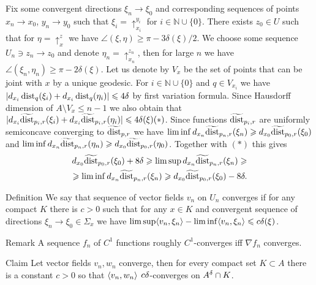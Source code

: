 \documentclass[a4paper,10pt]{article}
\begin{document}
Fix some convergent directions $\xi_n\to\xi_0$ and
corresponding sequences of points
$x_n\to x_0$, $y_n\to y_0$
such that  $\xi_i=\uparrow_{x_i}^{y_i}$ for $i\in\mathbb N\cup\{0\}$.
There exists $z_0 \in U$ such that for $\eta=\uparrow_x^z$ 
we have
$\angle(\xi,\eta)\ge \pi-3\delta(\xi)/2$.
We choose some sequence 
$U_n\ni z_n\to z_0$
and denote
$\eta_n=\uparrow_{x_n}^{z_n}$,
then for large $n$ we have $\angle(\xi_n,\eta_n)\ge \pi-2\delta(\xi)$.
Let us denote by $V_x$ be the set of points that can be joint with $x$
by a unique geodesic. For $i\in\mathbb N\cup\{0\}$ and
$q\in V_{x_i}$ we have $|d_{x_i} \operatorname{dist}_q(\xi_i)+d_{x_i} \operatorname{dist}_q(\eta_i)|\leqslant 4\delta$ by first
variation formula.
Since Hausdorff dimension of $A\setminus V_x\le n-1$ we also obtain
that
$|d_{x_i} \widetilde{\operatorname{dist}}_{p_i,r}(\xi_i)+d_{x_i} \widetilde{\operatorname{dist}}_{p_i,r}(\eta_i)|\leqslant 4\delta(\xi) (*)$.
Since functions
$\widetilde{\operatorname{dist}}_{p_i,r}$ are uniformly semiconcave converging to
$\widetilde{\operatorname{dist}}_{p,r}$ we have
$\liminf d_{x_n}\widetilde{\operatorname{dist}}_{p_n,r}(\xi_n)\geqslant d_{x_0}\widetilde{\operatorname{dist}}_{p_0,r}(\xi_0)$ and $\liminf d_{x_n}\widetilde{\operatorname{dist}}_{p_n,r}(\eta_n)\geqslant d_{x_0}\widetilde{\operatorname{dist}}_{p_0,r}(\eta_0)$.
Together with $(*)$ this gives
\begin{align*}
 d_{x_0}\widetilde{\operatorname{dist}}_{p_0,r}(\xi_0)+8\delta\geqslant
\limsup d_{x_n}\widetilde{\operatorname{dist}}_{p_n,r}(\xi_n)\geqslant\\
\geqslant
\liminf d_{x_n}\widetilde{\operatorname{dist}}_{p_n,r}(\xi_n)\geqslant d_{x_0}\widetilde{\operatorname{dist}}_{p_0,r}(\xi_0)-8\delta.
\end{align*}

\begin{thm}{Definition}
We say that sequence of vector fields $v_n$ on $U_n$
converges if for any compact $K$ there is $c>0$ such that
for any $x\in K$ and convergent sequence of directions $\xi_n\to\xi_0\in \Sigma_x$ we have
$\limsup \langle v_n,\xi_n\rangle-\liminf \langle v_n,\xi_n\rangle\leqslant c\delta(\xi)$.



\end{thm}

\begin{thm}{Remark}
A sequence $f_n$ of $C^1$ functions roughly $C^1$-converges
iff $\nabla f_n$ converges.

\end{thm}


\begin{thm}{Claim}\label{lem:scalprod}
Let vector fields $v_n, w_n$ converge, then for every compact
set $K\subset A$ there is a constant $c>0$ so that
$\langle v_n, w_n\rangle$ $c\delta$-converges on $A^\delta\cap K$.
\end{thm}
\end{document}
